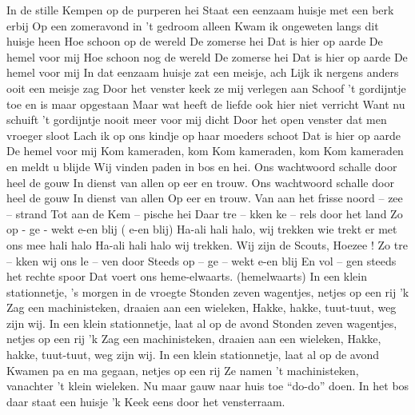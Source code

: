 \documentclass{article}
\begin{document}
\begin{songs}{}
\endsong
{}
\beginverse
In de stille Kempen op de purperen hei
Staat een eenzaam huisje met een berk erbij
Op een zomeravond in 't gedroom alleen
Kwam ik ongeweten langs dit huisje heen
\endverse
\beginchorus
Hoe schoon op de wereld
De zomerse hei
Dat is hier op aarde
De hemel voor mij
Hoe schoon nog de wereld
De zomerse hei
Dat is hier op aarde
De hemel voor mij
\endchorus
\beginverse
In dat eenzaam huisje zat een meisje, ach
Lijk ik nergens anders ooit een meisje zag
Door het venster keek ze mij verlegen aan
Schoof 't gordijntje toe en is maar opgestaan
\endverse
\beginverse
Maar wat heeft de liefde ook hier niet verricht
Want nu schuift 't gordijntje nooit meer voor mij dicht
Door het open venster dat men vroeger sloot
Lach ik op ons kindje op haar moeders schoot
\endverse
\beginverse
Dat is hier op aarde
De hemel voor mij
\endverse
\endsong
{}
\beginverse*
Kom kameraden, kom
Kom kameraden, kom
Kom kameraden 
en meldt u blijde
Wij vinden paden in bos en hei.
\endverse
\beginverse*
Ons wachtwoord schalle
door heel de gouw
In dienst van allen
op eer en trouw.
\endverse
\beginverse*
Ons wachtwoord schalle
door heel de gouw
In dienst van allen
Op eer en trouw.
\endverse
\endsong
{}
\beginverse
Van  aan  het  frisse  noord – zee – strand
Tot  aan de  Kem – pische  hei
Daar  tre – kken  ke – rels  door  het  land
Zo  op - ge - wekt  e-en  blij  ( e-en blij)
\endverse
\beginchorus
Ha-ali hali halo, wij trekken 
wie trekt er met ons mee hali halo
Ha-ali hali halo wij trekken.
Wij zijn de Scouts, Hoezee !
\endchorus
\beginverse
Zo  tre – kken  wij  ons  le – ven  door
Steeds  op – ge – wekt  e-en  blij
En  vol – gen steeds  het  rechte  spoor
Dat  voert  ons  heme-elwaarts. (hemelwaarts)
\endverse
\endsong
{}
\beginverse*
In een klein stationnetje, 's morgen in de vroegte
Stonden zeven wagentjes, netjes op een rij
'k Zag een machinisteken, draaien aan een wieleken,
Hakke, hakke, tuut-tuut, weg zijn wij. 
\endverse
\beginverse*
In een klein stationnetje, laat al op de avond
Stonden zeven wagentjes, netjes op een rij
'k Zag een machinisteken, draaien aan een wieleken,
Hakke, hakke, tuut-tuut, weg zijn wij. 
\endverse
\beginverse*
In een klein stationnetje, laat al op de avond
Kwamen pa en ma gegaan, netjes op een rij
Ze namen 't machinisteken, vanachter 't klein wieleken. 
Nu maar gauw naar huis toe “do-do” doen. 
\endverse
\endsong
{}
\beginverse*
In het bos daar staat een huisje
'k Keek eens door het vensterraam.

\end{songs}
\end{document}
